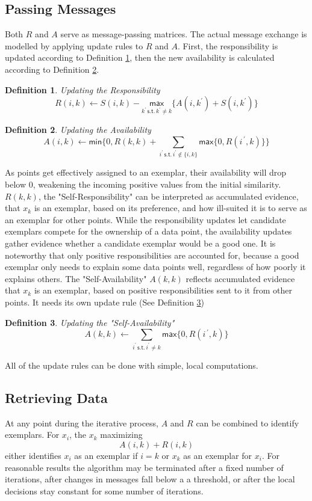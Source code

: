 \documentclass[11pt,a4paper]{article}
\newtheorem{definition}{Definition}
\begin{document}
\subsection{Passing Messages}
Both $R$ and $A$ serve as message-passing matrices. The actual message exchange is modelled by applying update rules to $R$ and $A$. First, the responsibility is updated according to Definition \ref{def:respupdate}, then the new availability is calculated according to Definition \ref{def:avupdate}.
\begin{definition}\label{def:respupdate}
	Updating the Responsibility
	\[
		R(i,k) \leftarrow S(i,k) - \underset{k^\prime\, \mathsf{s.t.}\, k^\prime \neq k}{\mathsf{max}} \{A(i,k^\prime) + S(i,k^\prime)\}
	\]
\end{definition}
\begin{definition}\label{def:avupdate}
	Updating the Availability
	\[
		A(i,k) \leftarrow \mathsf{min}\{0,R(k,k) + \sum\limits_{i^\prime\,\mathsf{s.t.}\, i^\prime \notin \{i,k\}}\mathsf{max}\{0, R(i^{\, \prime} ,k)\}\}
	\]
\end{definition}
As points get effectively assigned to an exemplar, their availability will drop below 0, weakening the incoming positive values from the initial similarity. $R(k,k)$, the "Self-Responsibility" can be interpreted as accumulated evidence, that $x_k$ is an exemplar, based on its preference, and how ill-suited it is to serve as an exemplar for other points. \cite{frey2007clustering} While the responsibility updates let candidate exemplars compete for the ownership of a data point, the availability updates gather evidence whether a candidate exemplar would be a good one. It is noteworthy that only positive responsibilities are accounted for, because a good exemplar only needs to explain some data points well, regardless of how poorly it explains others. \cite{frey2007clustering} The "Self-Availability" $A(k,k)$ reflects accumulated evidence that $x_k$ is an exemplar, based on positive responsibilities sent to it from other points. It needs its own update rule (See Definition \ref{def:savupdate})
\begin{definition}\label{def:savupdate}
	Updating the "Self-Availability"
	\[
   		A(k,k) \leftarrow \sum\limits_{i^\prime\, \mathsf{s.t.}\, i^\prime \neq k} \mathsf{max} \{0, R(i^{\, \prime} ,k)\}
	\]
\end{definition}
All of the update rules can be done with simple, local computations. \cite{frey2007clustering}
\subsection{Retrieving Data}
At any point during the iterative process, $A$ and $R$ can be combined to identify exemplars. For $x_i$, the $x_k$ maximizing
\[
	A(i,k) + R(i,k)
\]
either identifies $x_i$ as an exemplar if $i=k$ or $x_k$ as an exemplar for $x_i$. \cite{frey2007clustering} For reasonable results the algorithm may be terminated after a fixed number of iterations, after changes in messages fall below a a threshold, or after the local decisions stay constant for some number of iterations. \cite{frey2007clustering}
\end{document}
